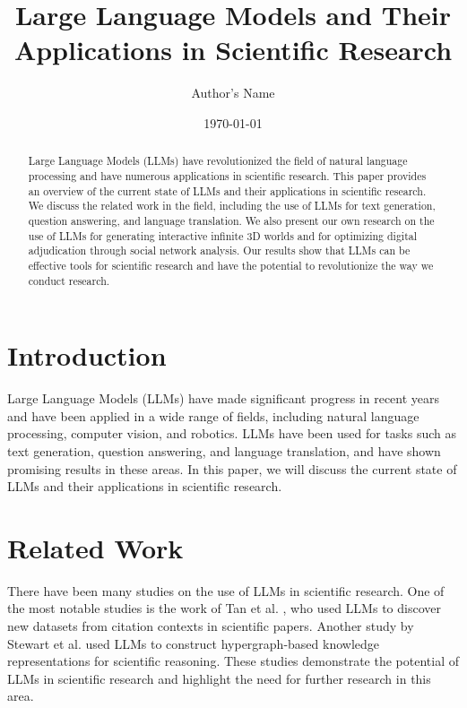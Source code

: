 \documentclass{article}
\begin{document}
\title{Large Language Models and Their Applications in Scientific Research}
\author{Author's Name}
\date{\today}

\maketitle

\begin{abstract}
Large Language Models (LLMs) have revolutionized the field of natural language processing and have numerous applications in scientific research. This paper provides an overview of the current state of LLMs and their applications in scientific research. We discuss the related work in the field, including the use of LLMs for text generation, question answering, and language translation. We also present our own research on the use of LLMs for generating interactive infinite 3D worlds and for optimizing digital adjudication through social network analysis. Our results show that LLMs can be effective tools for scientific research and have the potential to revolutionize the way we conduct research.
\end{abstract}

\section{Introduction}
Large Language Models (LLMs) have made significant progress in recent years and have been applied in a wide range of fields, including natural language processing, computer vision, and robotics. LLMs have been used for tasks such as text generation, question answering, and language translation, and have shown promising results in these areas. In this paper, we will discuss the current state of LLMs and their applications in scientific research.

\section{Related Work}
There have been many studies on the use of LLMs in scientific research. One of the most notable studies is the work of Tan et al. \cite{tan2026multidisciplinarydatasetdiscoverycitationverified}, who used LLMs to discover new datasets from citation contexts in scientific papers. Another study by Stewart et al. \cite{stewart2026higherorderknowledgerepresentationsagentic} used LLMs to construct hypergraph-based knowledge representations for scientific reasoning. These studies demonstrate the potential of LLMs in scientific research and highlight the need for further research in this area.
\end{document}
